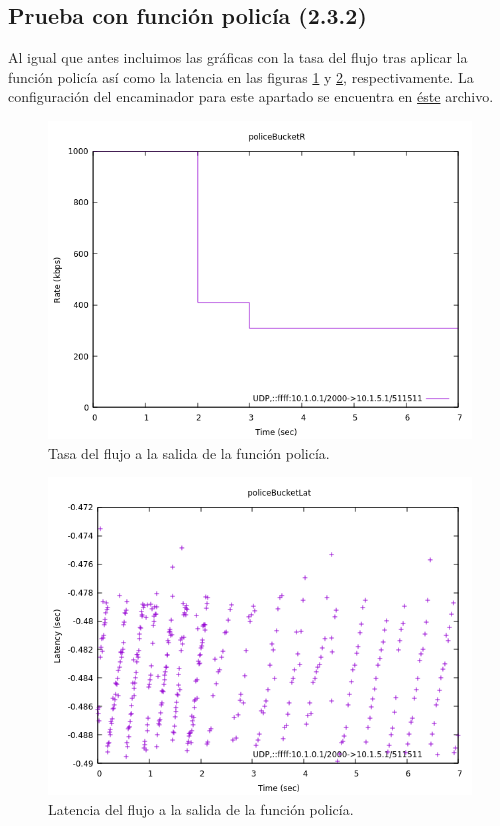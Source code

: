 \documentclass[11pt]{article}
\begin{document}
        \subsection{Prueba con función policía (2.3.2)}
            Al igual que antes incluimos las gráficas con la tasa del flujo tras aplicar la función policía así como la latencia en las figuras \ref{fig:policeBucketR} y \ref{fig:policeBucketLat}, respectivamente. La configuración del encaminador para este apartado se encuentra en \href{https://github.com/UAH-s-Telematics-Engineering-Tasks/traff_eng/blob/master/P2/Router_confs/policeBucket.cfg}{éste} archivo.

            \begin{figure}
                \centering
                \includegraphics[width=0.6\linewidth]{policeBucketR.png}
                \caption{Tasa del flujo a la salida de la función policía.}
                \label{fig:policeBucketR}
            \end{figure}

            \begin{figure}
                \centering
                \includegraphics[width=0.6\linewidth]{policeBucketLat.png}
                \caption{Latencia del flujo a la salida de la función policía.}
                \label{fig:policeBucketLat}
            \end{figure}
\end{document}
